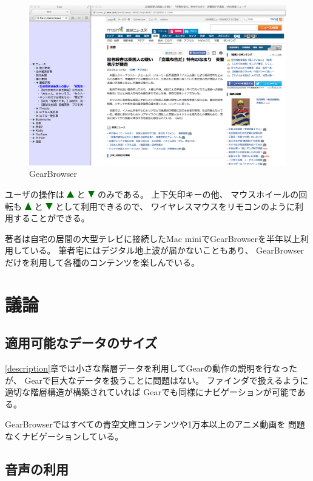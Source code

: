 \documentclass[twoside]{wiss}
\def\GEAR{\textsf{Gear}}
\def\GB{\textsf{GearBrowser}}
\def\uptriangle{ \includegraphics[width=3mm,bb=0 0 36 36]{figures/uptriangle.pdf} }
\def\downtriangle{ \includegraphics[width=3mm,bb=0 0 36 36]{figures/downtriangle.pdf} }
\begin{document}
\begin{figure}
\centerline{\includegraphics[width=160mm,bb=0 0 1401 872]{figures/ab4ff7c2d44f4af2bb94fae76589f495.png}}
\caption{\textsf{GearBrowser}}
\label{gearbrowser}
\end{figure}

ユーザの操作は{\uptriangle}と{\downtriangle}のみである。
上下矢印キーの他、
マウスホイールの回転も{\uptriangle}と{\downtriangle}として利用できるので、
ワイヤレスマウスをリモコンのように利用することができる。

著者は自宅の居間の大型テレビに接続したMac miniで{\GB}を半年以上利用している。
筆者宅にはデジタル地上波が届かないこともあり、
{\GB}だけを利用して各種のコンテンツを楽しんでいる。

\section{議論}

\subsection{適用可能なデータのサイズ}

\ref{description}章では小さな階層データを利用して{\GEAR}の動作の説明を行なったが、
{\GEAR}で巨大なデータを扱うことに問題はない。
ファインダで扱えるように適切な階層構造が構築されていれば
{\GEAR}でも同様にナビゲーションが可能である。

{\GB}ではすべての青空文庫コンテンツや1万本以上のアニメ動画を
問題なくナビゲーションしている。


\subsection{音声の利用}
\end{document}
